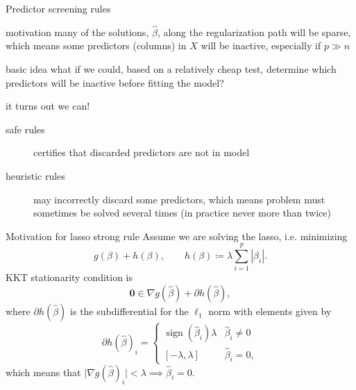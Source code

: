 \documentclass[10pt,ignorenonframetext]{beamer}
\DeclareMathOperator{\sign}{sign}
\begin{document}

\begin{frame}{Predictor screening rules}
\begin{block}{motivation}
many of the solutions, \(\hat\beta\), 
along the regularization path will be \alert{sparse}, which means some 
predictors (columns) in \(X\) will be \alert{inactive}, especially
if \(p \gg n\)\medskip
\end{block}
\pause
\begin{block}{basic idea}
what if we could, based on a relatively \alert{cheap} test, determine which
predictors will be inactive before fitting the model?
\end{block}
\pause
\begin{block}{it turns out we can!}
\begin{description}
\item[safe rules] certifies that discarded predictors are not in model
\item[heuristic rules] may incorrectly discard some predictors,
                       which means problem must
                       sometimes be solved several times (in practice never more
                       than twice)
\end{description}
\end{block}
\end{frame}

\begin{frame}{Motivation for lasso strong rule}
Assume we are solving the lasso, i.e. minimizing \[g(\beta) + h(\beta), \qquad h(\beta) \coloneqq \lambda \sum_{i=1}^p |\beta_i|.\]
KKT stationarity condition is \[\boldsymbol{0} \in \nabla g(\hat\beta) + \partial h(\hat\beta),\] where
\(\partial h(\hat\beta)\) is the subdifferential for the \(\ell_1\) norm with elements
given by
\[
\partial h(\hat\beta)_i = 
\begin{cases} 
    \sign(\hat\beta_i)\lambda     & \hat\beta_i \neq 0\\ 
    [-\lambda, \lambda]           & \hat\beta_i = 0,
\end{cases}
\]
which means that \(\lvert \nabla g(\hat\beta)_i\rvert < \lambda \implies \hat\beta_i = 0\).
\end{frame}
\end{document}
